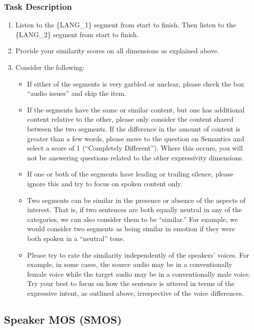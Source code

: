 \subsubsection{Task Description}
\begin{enumerate}
    \item Listen to the \{LANG\_1\} segment from start to finish. Then listen to the \{LANG\_2\} segment from start to finish. 
    \item Provide your similarity scores on all dimensions as explained above.
    \item Consider the following:
    \begin{itemize}
        \item If either of the segments is very garbled or unclear, please check the box “audio issues” and skip the item.
        \item If the segments have the same or similar content, but one has additional content relative to the other, please only consider the content shared between the two segments. If the difference in the amount of content is greater than a few words, please move to the question on Semantics and select a score of 1 (“Completely Different”). Where this occurs, you will not be answering questions related to the other expressivity dimensions.
        \item If one or both of the segments have leading or trailing silence, please ignore this and try to focus on spoken content only.
        \item Two segments can be similar in the presence or absence of the aspects of interest. That is, if two sentences are both equally neutral in any of the categories, we can also consider them to be “similar.” For example, we would consider two segments as being similar in emotion if they were both spoken in a “neutral” tone.
        \item Please try to rate the similarity independently of the speakers’ voices. For example, in some cases, the source audio may be in a conventionally female voice while the target audio may be in a conventionally male voice. Try your best to focus on how the sentence is uttered in terms of the expressive intent, as outlined above, irrespective of the voice differences.
    \end{itemize}
\end{enumerate}

\subsection{Speaker MOS (SMOS)}
\label{sec:SMOS_protocol_text}
